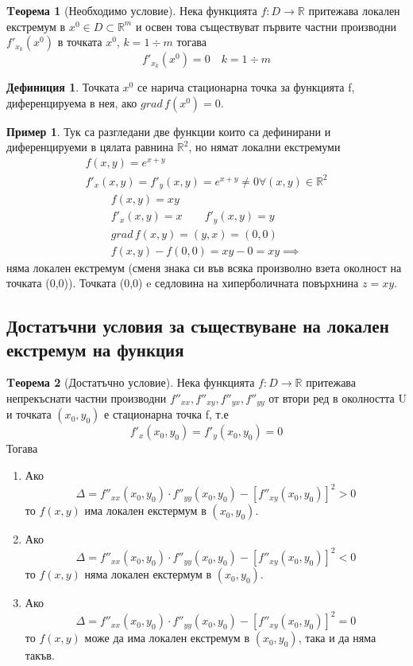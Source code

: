 \documentclass[a4paper,fleqn,12pt]{article}
\theoremstyle{definition}
\newtheorem{theorem}{Tеорема}[subsection]
\newtheorem{definition}{Дефиниция}[subsection]
\newtheorem{example}{Пример}[subsection]
\begin{document}
\begin{theorem}[Необходимо условие]
Нека функцията $f: D \to \mathbb{R}$ притежава локален екстремум в $x^0 \in D \subset \mathbb{R}^m$ и освен това съществуват първите частни производни $f'_{x_k}(x^0)$ в точката $x^0, \, k = 1 \div m$ тогава
$$f'_{x_k}(x^0) = 0 \quad  k = 1 \div m$$ 
\end{theorem}

\begin{definition}
Точката $x^0$ се нарича стационарна точка за функцията f, диференцируема в нея, ако $grad \, f(x^0) = 0$.
\end{definition}

\begin{example}
Тук са разгледани две функции които са дефинирани и диференцируеми в цялата равнина $\mathbb{R}^2$, но нямат локални екстремуми
\begin{gather*}
f(x,y) = e^{x+y}\\
f'_x(x,y) = f'_y(x,y) = e^{x+y} \neq 0 \forall (x,y) \in \mathbb{R}^2
\end{gather*}
\begin{gather*}
f(x,y) = xy \\
f'_x(x,y) = x \qquad f'_y(x,y) = y\\
grad\, f(x,y) = (y,x) = (0,0)\\
f(x,y) - f(0,0) = xy-0 = xy \implies 
\end{gather*}
няма локален екстремум (сменя знака си във всяка произволно взета околност на точката (0,0)). Точката (0,0) e седловина на хиперболичната повърхнина $z = xy$.
\end{example}

\subsection{Достатъчни условия за съществуване на локален екстремум на функция}

\begin{theorem}[Достатъчно условие]
Нека функцията $f: D \to \mathbb{R}$ притежава непрекъснати частни производни $ f''_{xx}, f''_{xy}, f''_{yx}, f''_{yy}$ от втори ред в околността U и точката $(x_0, y_0)$ е стационарна точка f, т.е
$$f'_x(x_0, y_0) = f'_y(x_0, y_0) = 0$$
Тогава 
\begin{enumerate}
\item Ако
$$\Delta = f''_{xx}(x_0, y_0) \cdot f''_{yy}(x_0, y_0) - \left[f''_{xy}(x_0, y_0)\right]^2 > 0$$
то $f(x, y)$ има локален екстермум в $(x_0, y_0)$. 
\item Ако
$$\Delta = f''_{xx}(x_0, y_0) \cdot f''_{yy}(x_0, y_0) - \left[f''_{xy}(x_0, y_0)\right]^2 < 0$$
то $f(x, y)$ няма локален екстермум в $(x_0, y_0)$. 
\item Ако
$$\Delta = f''_{xx}(x_0, y_0) \cdot f''_{yy}(x_0, y_0) - \left[f''_{xy}(x_0, y_0)\right]^2 = 0$$
то $f(x, y)$ може да има локален екстремум в $(x_0, y_0)$, така и да няма такъв. 
\end{enumerate}
\end{theorem}
\end{document}
